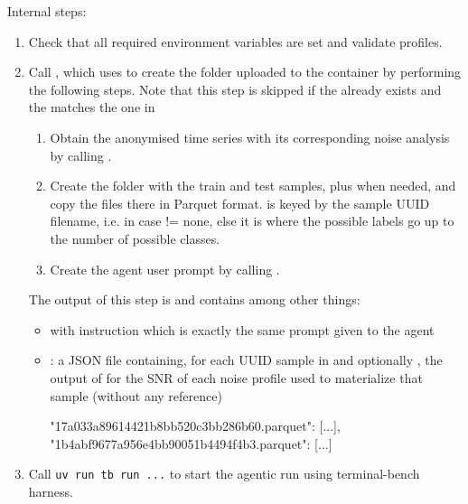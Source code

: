 \documentclass[11pt]{article}
\begin{document}
Internal steps:
\begin{enumerate}
  \item Check that all required environment variables are set and validate profiles.
  \item Call , which uses  to create the folder uploaded to the container by performing the following steps.
  Note that this step is skipped if the  already exists and the  matches the one in 
  \begin{enumerate}
    \item Obtain the anonymised time series with its corresponding noise analysis by calling .
    \item Create the  folder with the train and test samples, plus  when needed, and copy the files there in Parquet format.
     is keyed by the sample UUID filename, i.e.  in case \termDescLevel != none, else it is  where the possible labels go up to the number of possible classes.
    \item Create the agent user prompt by calling . 
  \end{enumerate}
  The output of this step is  and contains among other things:
  \begin{itemize}
    \item {} with instruction which is exactly the same prompt given to the agent
    \item {}: a JSON file containing, for each UUID sample in  and optionally , the output of  for the SNR of each noise profile used to materialize that sample (without any reference) 
    \begin{DocCode}
      {
        "17a033a89614421b8bb520c3bb286b60.parquet": {[...]},
        "1b4abf9677a956e4bb90051b4494f4b3.parquet": {[...]}
      }
    \end{DocCode}
  \end{itemize}
  \item Call \verb|uv run tb run ...| to start the agentic run using terminal-bench harness.

\end{enumerate}
\end{document}
